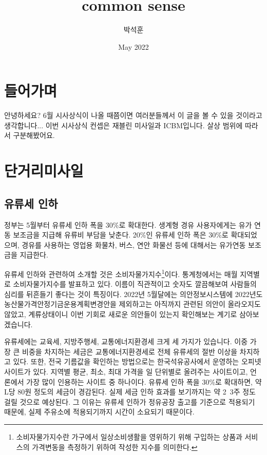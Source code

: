 \documentclass[preprint]{revtex4-2}
\begin{document}
\title{common sense}
\author{박석훈}
\date{May 2022}


\section{들어가며}
안녕하세요? 6월 시사상식이 나올 때쯤이면 여러분들께서 이 글을 볼 수 있을 것이라고 생각합니다... 이번 시사상식 컨셉은 재블린 미사일과 ICBM입니다. 살상 범위에 따라서 구분해봤어요. 

\section{단거리미사일}

\subsection{유류세 인하}

정부는 5월부터 유류세 인하 폭을 30\%로 확대한다. 생계형 경유 사용자에게는 유가 연동 보조금을 지급해 유류비 부담을 낮춘다. 20\%인 유류세 인하 폭은 30\%로 확대되었으며, 경유를 사용하는 영업용 화물차, 버스, 연안 화물선 등에 대해서는 유가연동 보조금을 지급한다.

유류세 인하와 관련하여 소개할 것은 소비자물가지수\footnote{소비자물가지수란 가구에서 일상소비생활을 영위하기 위해 구입하는 상품과 서비스의 가격변동을 측정하기 위하여 작성한 지수를 의미한다.}이다. 통계청에서는 매월 지역별로 소비자물가지수를 발표하고 있다. 이름이 직관적이고 숫자도 깔끔해보여 사람들의 심리를 뒤흔들기 좋다는 것이 특징이다. 2022년 5월달에는 의안정보시스템에 2022년도 농산물가격안정기금운용계획변경안을 제외하고는 아직까지 관련된 의안이 올라오지도 않았고, 계류상태이니 이번 기회로 새로운 의안들이 있는지 확인해보는 계기로 삼아보겠습니다.

유류세에는 교육세, 지방주행세, 교통에너지환경세 크게 세 가지가 있습니다. 이중 가장 큰 비중을 차지하는 세금은 교통에너지환경세로 전체 유류세의 절반 이상을 차지하고 있다. 또한, 전국 기름값을 확인하는 방법으로는 한국석유공사에서 운영하는 오피넷 사이트가 있다. 지역별 평균, 최소, 최대 가격을 일 단위별로 올려주는 사이트이고, 언론에서 가장 많이 인용하는 사이트 중 하나이다. 유류세 인하 폭을 30\%로 확대하면, 약 L당 80원 정도의 세금이 경감된다. 실제 세금 인하 효과를 보기까지는 약 2~3주 정도 걸릴 것으로 예상된다. 그 이유는 유류세 인하가 정유공장 출고를 기준으로 적용되기 때문에, 실제 주유소에 적용되기까지 시간이 소요되기 때문이다. \\
\end{document}
